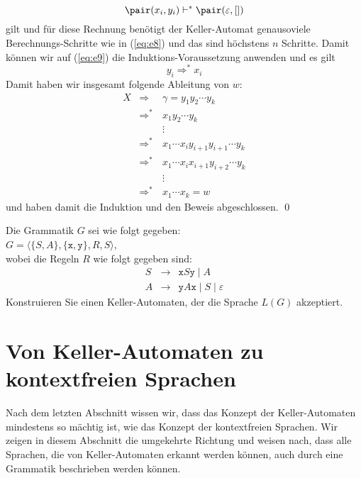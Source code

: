 \begin{enumerate}
\begin{equation}
              \pair(x_i, y_i) \vdash^* \pair(\varepsilon, [])                          
            \end{equation}
            gilt und f\"ur diese Rechnung ben\"otigt der Keller-Automat genausoviele
            Berechnungs-Schritte wie in (\ref{eq:e8}) und das sind h\"ochstens $n$ Schritte.
            Damit k\"onnen wir auf (\ref{eq:e9}) die Induktions-Voraussetzung anwenden und es gilt
            \begin{equation}
              \label{eq:e10}
              y_i \Rightarrow^* x_i
            \end{equation}
            Damit haben wir insgesamt folgende Ableitung von $w$:
            \begin{eqnarray*}            
            X & \Rightarrow\;\; & \gamma = y_1 y_2 \cdots y_k               \\
              & \Rightarrow^* & x_1 y_2 \cdots y_k                        \\
              &               & \vdots                                    \\
              & \Rightarrow^* & x_1 \cdots x_i y_{i+1} y_{i+1} \cdots y_k \\
              & \Rightarrow^* & x_1 \cdots x_i x_{i+1} y_{i+2} \cdots y_k \\
              &               & \vdots                                    \\
              & \Rightarrow^* & x_1 \cdots x_k = w  
            \end{eqnarray*}
            und haben damit die Induktion und den Beweis abgeschlossen. \qed
\end{enumerate}

\exercise
Die Grammatik $G$ sei wie folgt gegeben:
\\[0.2cm]
\hspace*{1.3cm}
$G = \langle \{S,A\}, \{ \texttt{x}, \texttt{y}\}, R, S \rangle$,
\\[0.2cm]
wobei die Regeln $R$ wie folgt gegeben sind:
\begin{eqnarray*}
  S & \rightarrow & \texttt{x}S\texttt{y} \mid A \\
  A & \rightarrow & \texttt{y}A\texttt{x} \mid S \mid \varepsilon
\end{eqnarray*}
Konstruieren Sie einen Keller-Automaten, der die Sprache $L(G)$ akzeptiert.
\pagebreak

\section{Von Keller-Automaten zu kontextfreien Sprachen}
Nach dem letzten Abschnitt wissen wir, dass das Konzept der Keller-Automaten mindestens so
m\"achtig ist, wie das Konzept der kontextfreien Sprachen.
Wir zeigen in diesem Abschnitt die umgekehrte Richtung und weisen nach, dass alle
Sprachen, die von Keller-Automaten erkannt werden k\"onnen, auch durch eine Grammatik
beschrieben werden k\"onnen.

